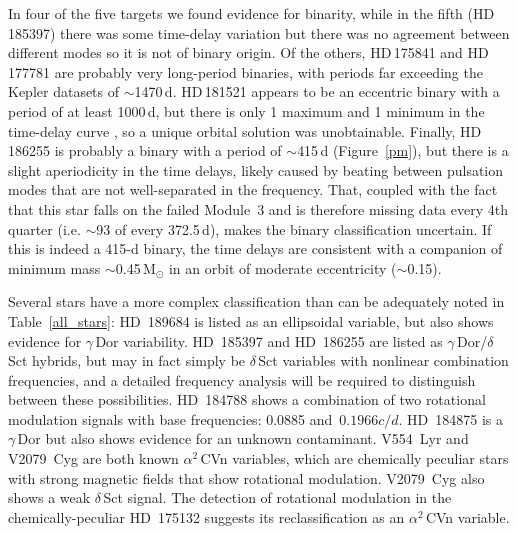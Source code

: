 \documentclass[modern]{aastex62}
\begin{document}
In four of the five targets we found evidence for binarity, while in the fifth (HD\,185397) there was some time-delay variation but there was no agreement between different modes so it is not of binary origin. Of the others, HD\,175841 and HD\,177781 are probably very long-period binaries, with periods far exceeding the Kepler datasets of $\sim$1470\,d. HD\,181521 appears to be an eccentric binary with a period of at least 1000\,d, but there is only 1 maximum and 1 minimum in the time-delay curve \citep[cf.][]{murphy&shibahashi2015}, so a unique orbital solution was unobtainable. Finally, HD\,186255 is probably a binary with a period of $\sim$415\,d (Figure~\ref{pm}), but there is a slight aperiodicity in the time delays, likely caused by beating between pulsation modes that are not well-separated in the frequency. That, coupled with the fact that this star falls on the failed Module~3 and is therefore missing data every 4th quarter (i.e. $\sim$93 of every 372.5\,d), makes the binary classification uncertain. If this is indeed a 415-d binary, the time delays are consistent with a companion of minimum mass $\sim$0.45\,M$_{\odot}$ in an orbit of moderate eccentricity ($\sim$0.15).

\begin{figure*}
\caption{\label{pm}
Time delay as a function of time for the $\delta$\,Sct star HD~186255, calculated for three of its oscillation modes ($f_2$, $f_5$, and $f_8$) and their average. These vary in unison, but with a small amplitude, and are possibly indicative of a low-mass or highly inclined companion.}
\end{figure*}

Several stars have a more complex classification than can be adequately noted in Table~\ref{all_stars}: HD~189684 is listed as an ellipsoidal variable, but also shows evidence for $\gamma$\,Dor variability. HD~185397 and HD~186255 are listed as $\gamma$\,Dor/$\delta$\,Sct hybrids, but may in fact simply be $\delta$\,Sct variables with nonlinear combination frequencies, and a detailed frequency analysis will be required to distinguish between these possibilities. HD~184788 shows a combination of two rotational modulation signals with base frequencies: 0.0885 and~$0.1966 c/d$. HD~184875 is a $\gamma$\,Dor but also shows evidence for an unknown contaminant. V554~Lyr and V2079~Cyg are both known $\alpha^2$\,CVn variables, which are chemically peculiar stars with strong magnetic fields that show rotational modulation. V2079~Cyg also shows a weak $\delta$\,Sct signal. The detection of rotational modulation in the chemically-peculiar HD~175132 suggests its reclassification as an $\alpha^2$\,CVn variable. 
\end{document}
